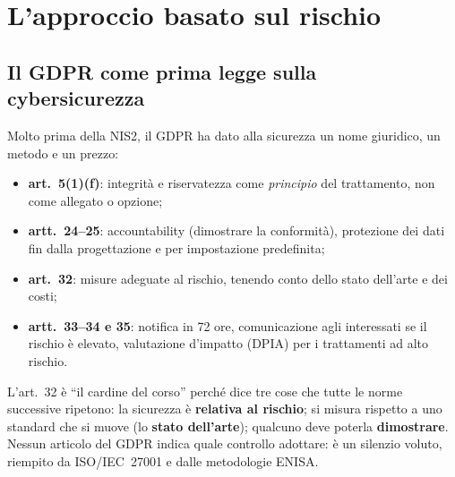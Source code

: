 \section{L'approccio basato sul rischio}
\label{sec:intro-rischio}

\subsection{Il GDPR come prima legge sulla cybersicurezza}
Molto prima della NIS2, il GDPR ha dato alla sicurezza un nome giuridico, un metodo e un prezzo:
\begin{itemize}
  \item \textbf{art.~5(1)(f)}: integrità e riservatezza come \emph{principio} del trattamento, non come
    allegato o opzione;
  \item \textbf{artt.~24--25}: accountability (dimostrare la conformità), protezione dei dati fin dalla
    progettazione e per impostazione predefinita;
  \item \textbf{art.~32}: misure adeguate al rischio, tenendo conto dello stato dell'arte e dei costi;
  \item \textbf{artt.~33--34 e 35}: notifica in 72 ore, comunicazione agli interessati se il rischio è
    elevato, valutazione d'impatto (DPIA) per i trattamenti ad alto rischio.
\end{itemize}
L'art.~32 è ``il cardine del corso'' perché dice tre cose che tutte le norme successive ripetono: la
sicurezza è \textbf{relativa al rischio}; si misura rispetto a uno standard che si muove (lo
\textbf{stato dell'arte}); qualcuno deve poterla \textbf{dimostrare}. Nessun articolo del GDPR indica
quale controllo adottare: è un silenzio voluto, riempito da ISO/IEC~27001 e dalle metodologie ENISA.

